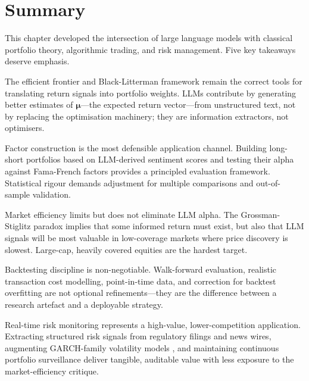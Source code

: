\section{Summary}
\label{sec:ch10-summary}

This chapter developed the intersection of large language models with classical portfolio
theory, algorithmic trading, and risk management. Five key takeaways deserve emphasis.

The efficient frontier \citep{markowitz1952portfolio} and Black-Litterman framework
\citep{blacklitterman1992} remain the correct tools for translating return signals into
portfolio weights. LLMs contribute by generating better estimates of
$\boldsymbol{\mu}$---the expected return vector---from unstructured text, not by
replacing the optimisation machinery; they are information extractors, not optimisers.

Factor construction is the most defensible application channel. Building long-short
portfolios based on LLM-derived sentiment scores and testing their alpha against
Fama-French factors \citep{fama1993common, fama2015five} provides a principled
evaluation framework. Statistical rigour demands adjustment for multiple comparisons
\citep{harvey2016cross} and out-of-sample validation.

Market efficiency limits but does not eliminate LLM alpha. The Grossman-Stiglitz
paradox \citep{grossman1980impossibility} implies that some informed return must exist,
but also that LLM signals will be most valuable in low-coverage markets where price
discovery is slowest. Large-cap, heavily covered equities are the hardest target.

Backtesting discipline is non-negotiable. Walk-forward evaluation, realistic
transaction cost modelling, point-in-time data, and correction for backtest overfitting
\citep{bailey2014probability, lopezdeprado2018advances} are not optional refinements---they
are the difference between a research artefact and a deployable strategy.

Real-time risk monitoring represents a high-value, lower-competition application.
Extracting structured risk signals from regulatory filings and news wires, augmenting
GARCH-family volatility models \citep{engle2002dynamic}, and maintaining continuous
portfolio surveillance deliver tangible, auditable value with less exposure to the
market-efficiency critique.

